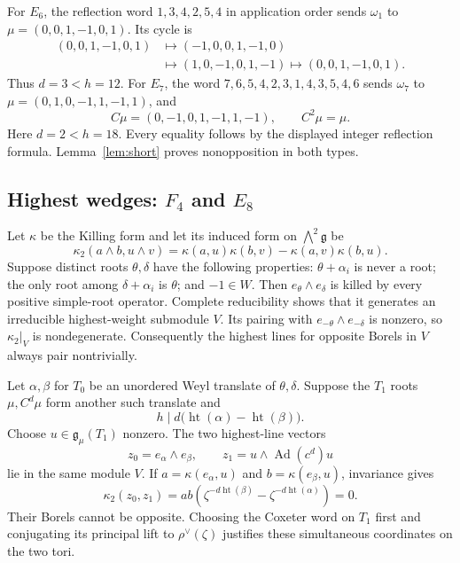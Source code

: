 \documentclass[11pt]{article}
\newcommand{\g}{\mathfrak g}\newcommand{\tfr}{\mathfrak t}
\newcommand{\Ad}{\operatorname{Ad}}\newcommand{\Aut}{\operatorname{Aut}}
\newcommand{\height}{\operatorname{ht}}\newcommand{\diag}{\operatorname{diag}}
\theoremstyle{definition}\newtheorem{definition}[theorem]{Definition}
\theoremstyle{remark}\newtheorem{remark}[theorem]{Remark}
\begin{document}
For $E_6$, the reflection word $1,3,4,2,5,4$ in application order sends $\omega_1$ to $\mu=(0,0,1,-1,0,1)$. Its cycle is
\begin{align*}
 (0,0,1,-1,0,1)&\longmapsto(-1,0,0,1,-1,0)\\
 &\longmapsto(1,0,-1,0,1,-1)
 \longmapsto(0,0,1,-1,0,1).
\end{align*}
Thus $d=3<h=12$. For $E_7$, the word $7,6,5,4,2,3,1,4,3,5,4,6$ sends $\omega_7$ to $\mu=(0,1,0,-1,1,-1,1)$, and
\[
 C\mu=(0,-1,0,1,-1,1,-1),\qquad C^2\mu=\mu.
\]
Here $d=2<h=18$. Every equality follows by the displayed integer reflection formula. Lemma~\ref{lem:short} proves nonopposition in both types.

\subsection{Highest wedges: \texorpdfstring{$F_4$ and $E_8$}{F4 and E8}}
Let $\kappa$ be the Killing form and let its induced form on $\bigwedge^2\g$ be
\[
 \kappa_2(a\wedge b,u\wedge v)
 =\kappa(a,u)\kappa(b,v)-\kappa(a,v)\kappa(b,u).
\]
Suppose distinct roots $\theta,\delta$ have the following properties: $\theta+\alpha_i$ is never a root; the only root among $\delta+\alpha_i$ is $\theta$; and $-1\in W$. Then $e_\theta\wedge e_\delta$ is killed by every positive simple-root operator. Complete reducibility shows that it generates an irreducible highest-weight submodule $V$. Its pairing with $e_{-\theta}\wedge e_{-\delta}$ is nonzero, so $\kappa_2|_V$ is nondegenerate. Consequently the highest lines for opposite Borels in $V$ always pair nontrivially.

Let $\alpha,\beta$ for $T_0$ be an unordered Weyl translate of $\theta,\delta$. Suppose the $T_1$ roots $\mu,C^d\mu$ form another such translate and
\begin{equation}\label{eq:wedgecondition}
 h\mid d\bigl(\height(\alpha)-\height(\beta)\bigr).
\end{equation}
Choose $u\in\g_\mu(T_1)$ nonzero. The two highest-line vectors
\[
 z_0=e_\alpha\wedge e_\beta,\qquad
 z_1=u\wedge\Ad(c^d)u
\]
lie in the same module $V$. If $a=\kappa(e_\alpha,u)$ and $b=\kappa(e_\beta,u)$, invariance gives
\[
 \kappa_2(z_0,z_1)=ab\left(
 \zeta^{-d\height(\beta)}-\zeta^{-d\height(\alpha)}\right)=0.
\]
Their Borels cannot be opposite. Choosing the Coxeter word on $T_1$ first and conjugating its principal lift to $\rho^\vee(\zeta)$ justifies these simultaneous coordinates on the two tori.
\end{document}
